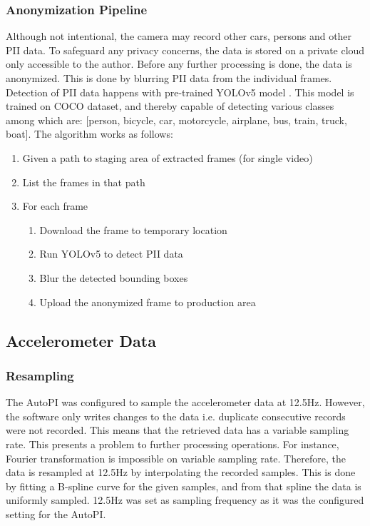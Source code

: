 \subsubsection{Anonymization Pipeline}
Although not intentional, the camera may record other cars, persons and other PII data. To safeguard any privacy concerns, the data is stored on a private cloud only accessible to the author. Before any further processing is done, the data is anonymized. This is done by blurring PII data from the individual frames. Detection of PII data happens with pre-trained YOLOv5 model \cite{Jocher2021}. This model is trained on COCO dataset, and thereby capable of detecting various classes among which are: [person, bicycle, car, motorcycle, airplane, bus, train, truck, boat]. The algorithm works as follows:
\begin{enumerate}
\item Given a path to staging area of extracted frames (for single video)
\item List the frames in that path
\item For each frame
\begin{enumerate}
\item Download the frame to temporary location
\item Run YOLOv5 to detect PII data
\item Blur the detected bounding boxes
\item Upload the anonymized frame to production area
\end{enumerate}
\end{enumerate}


\subsection{Accelerometer Data}


\subsubsection{Resampling}
The AutoPI was configured to sample the accelerometer data at 12.5Hz. However, the software only writes changes to the data i.e. duplicate consecutive records were not recorded. This means that the retrieved data has a variable sampling rate. This presents a problem to further processing operations. For instance, Fourier transformation is impossible on variable sampling rate. Therefore, the data is resampled at 12.5Hz by interpolating the recorded samples. This is done by fitting a B-spline curve for the given samples, and from that spline the data is uniformly sampled. 12.5Hz was set as sampling frequency as it was the configured setting for the AutoPI. 

